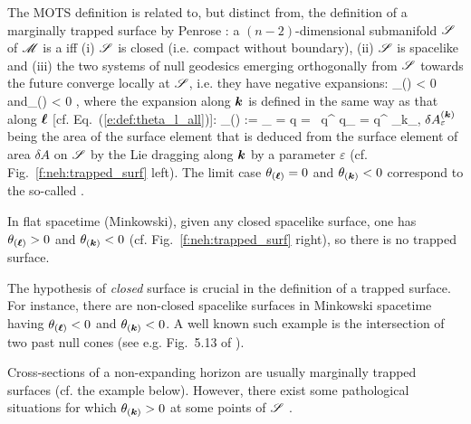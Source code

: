 The MOTS definition is related to, but distinct from, the definition of a
marginally trapped surface by Penrose \cite{Penro65}: a $(n-2)$-dimensional
submanifold $\mathscr{S}$ of $\mathscr{M}$ is a 
 iff (i) $\mathscr{S}$ is
closed (i.e. compact without boundary), (ii) $\mathscr{S}$ is spacelike and (iii)
the two systems of null geodesics emerging orthogonally from $\mathscr{S}$ towards the future
converge locally at $\mathscr{S}$, i.e. they have negative expansions:
\be
    \theta_{(\wl)} < 0 \quad\mbox{and}\quad \theta_{()} < 0 ,
\ee
where the expansion along $\bm{k}$ is defined in the same way as that along
$\bm{\ell}$ [cf. Eq.~(\ref{e:def:theta_l_all})]:
\be \label{e:neh:expansion_k}
    \theta_{()} := \lim_{\varepsilon{}} 
        =   \ln q
        =  \, q^{\mu\nu}  q_{\mu\nu}
        = q^{\mu\nu} \nabla_\mu k_\nu ,
\ee
$\delta A^{(\bm{k})}_\varepsilon$ being the area of the surface element
that is deduced from the surface element of area $\delta A$ on $\mathscr{S}$ by the
Lie dragging along $\bm{k}$ by a parameter $\varepsilon$ (cf. Fig.~\ref{f:neh:trapped_surf} left).
The limit case $\theta_{(\bm{\ell})} = 0$ and $\theta_{(\bm{k})}<0$ correspond
to the so-called .

In flat spacetime (Minkowski), given any closed spacelike surface,
one has $\theta_{(\bm{\ell})} > 0$ and $\theta_{(\bm{k})} < 0$ (cf. Fig.~\ref{f:neh:trapped_surf} right), so there
is no trapped surface.

\begin{remark}
The hypothesis of \emph{closed} surface is crucial in the definition of a
trapped surface. For instance, there are non-closed spacelike surfaces in
Minkowski spacetime having $\theta_{(\bm{\ell})} < 0$ and $\theta_{(\bm{k})} < 0$.
A well known such example is the intersection of two past null cones (see e.g.
Fig.~5.13 of \cite{FroloN98}).
\end{remark}

Cross-sections of a non-expanding horizon are usually marginally trapped surfaces
(cf. the example below).
However, there exist some pathological situations for
which $\theta_{(\bm{k})} > 0$ at some points of $\mathscr{S}$ \cite{GerocH82}.

